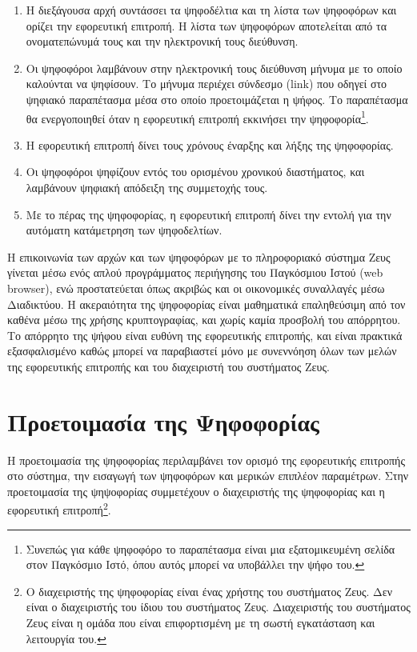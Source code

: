 \documentclass{tufte-handout}
\begin{document}
\begin{enumerate}

\item Η διεξάγουσα αρχή συντάσσει τα ψηφοδέλτια και τη λίστα των
  ψηφοφόρων και ορίζει την εφορευτική επιτροπή. Η λίστα των ψηφοφόρων
  αποτελείται από τα ονοματεπώνυμά τους και την ηλεκτρονική τους
  διεύθυνση.

\item Οι ψηφοφόροι λαμβάνουν στην ηλεκτρονική τους διεύθυνση μήνυμα με
  το οποίο καλούνται να ψηφίσουν. Το μήνυμα περιέχει σύνδεσμο (link)
  που οδηγεί στο ψηφιακό παραπέτασμα μέσα στο οποίο προετοιμάζεται η
  ψήφος. Το παραπέτασμα θα ενεργοποιηθεί όταν η εφορευτική επιτροπή
  εκκινήσει την ψηφοφορία\footnote{Συνεπώς για κάθε ψηφοφόρο το
    παραπέτασμα είναι μια εξατομικευμένη σελίδα στον Παγκόσμιο Ιστό,
    όπου αυτός μπορεί να υποβάλλει την ψήφο του.}.

\item Η εφορευτική επιτροπή δίνει τους χρόνους έναρξης και λήξης της
  ψηφοφορίας.

\item Οι ψηφοφόροι ψηφίζουν εντός του ορισμένου χρονικού διαστήματος,
  και λαμβάνουν ψηφιακή απόδειξη της συμμετοχής τους.

\item Με το πέρας της ψηφοφορίας, η εφορευτική επιτροπή δίνει την
  εντολή για την αυτόματη κατάμετρηση των ψηφοδελτίων.

\end{enumerate}

\noindent Η επικοινωνία των αρχών και των ψηφοφόρων με το πληροφοριακό
σύστημα Ζευς γίνεται μέσω ενός απλού προγράμματος περιήγησης του
Παγκόσμιου Ιστού (web browser), ενώ προστατεύεται όπως ακριβώς και οι
οικονομικές συναλλαγές μέσω Διαδικτύου. Η ακεραιότητα της ψηφοφορίας
είναι μαθηματικά επαληθεύσιμη από τον καθένα μέσω της χρήσης
κρυπτογραφίας, και χωρίς καμία προσβολή του απόρρητου. Το απόρρητο της
ψήφου είναι ευθύνη της εφορευτικής επιτροπής, και είναι πρακτικά
εξασφαλισμένο καθώς μπορεί να παραβιαστεί μόνο με συνεννόηση όλων των
μελών της εφορευτικής επιτροπής και του διαχειριστή του συστήματος
Ζευς.

\section{Προετοιμασία της Ψηφοφορίας}

Η προετοιμασία της ψηφοφορίας περιλαμβάνει τον ορισμό της εφορευτικής
επιτροπής στο σύστημα, την εισαγωγή των ψηφοφόρων και μερικών επιπλέον
παραμέτρων. Στην προετοιμασία της ψηψοφορίας συμμετέχουν ο
διαχειριστής της ψηφοφορίας και η εφορευτική επιτροπή\footnote{Ο
  διαχειριστής της ψηφοφορίας είναι ένας χρήστης του συστήματος Ζευς.
  Δεν είναι ο διαχειριστής του ίδιου του συστήματος Ζευς. Διαχειριστής
  του συστήματος Ζευς είναι η ομάδα που είναι επιφορτισμένη με τη
  σωστή εγκατάσταση και λειτουργία του.}.
\end{document}
